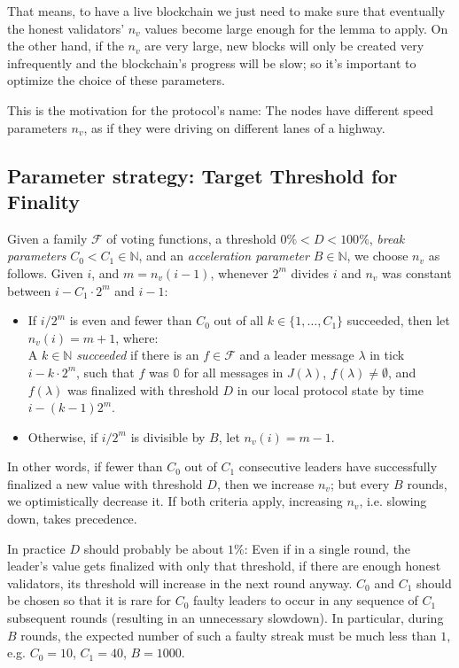 \documentclass[12pt]{article}
\begin{document}
That means, to have a live blockchain we just need to make sure that eventually the honest validators' $n_v$ values become large enough for the lemma to apply. On the other hand, if the $n_v$ are very large, new blocks will only be created very infrequently and the blockchain's progress will be slow; so it's important to optimize the choice of these parameters.

This is the motivation for the protocol's name: The nodes have different speed parameters $n_v$, as if they were driving on different lanes of a highway.


\subsection{Parameter strategy: Target Threshold for Finality}

Given a family $\mathcal{F}$ of voting functions, a threshold $0\% < D < 100\%$, \emph{break parameters} $C_0 < C_1 \in \mathbb{N}$, and an \emph{acceleration parameter} $B \in \mathbb{N}$, we choose $n_v$ as follows. Given $i$, and $m = n_v(i - 1)$, whenever $2^m$ divides $i$ and $n_v$ was constant between $i - C_1 \cdot 2^m$ and $i - 1$:
\begin{itemize}
  \item If $i/2^m$ is even and fewer than $C_0$ out of all $k \in \{1, \ldots, C_1\}$ succeeded, then let $n_v(i) = m + 1$, where:\\
    A $k \in \mathbb{N}$ \emph{succeeded} if there is an $f \in \mathcal{F}$ and a leader message $\lambda$ in tick $i - k \cdot 2^m$, such that $f$ was $\mathbb{0}$ for all messages in $J(\lambda)$, $f(\lambda) \neq \emptyset$, and $f(\lambda)$ was finalized with threshold $D$ in our local protocol state by time $i - (k - 1) 2^m$.
  \item Otherwise, if $i/2^m$ is divisible by $B$, let $n_v(i) = m - 1$.
\end{itemize}
In other words, if fewer than $C_0$ out of $C_1$ consecutive leaders have successfully finalized a new value with threshold $D$, then we increase $n_v$; but every $B$ rounds, we optimistically decrease it. If both criteria apply, increasing $n_v$, i.e. slowing down, takes precedence.

In practice $D$ should probably be about $1\%$: Even if in a single round, the leader's value gets finalized with only that threshold, if there are enough honest validators, its threshold will increase in the next round anyway. $C_0$ and $C_1$ should be chosen so that it is rare for $C_0$ faulty leaders to occur in any sequence of $C_1$ subsequent rounds (resulting in an unnecessary slowdown). In particular, during $B$ rounds, the expected number of such a faulty streak must be much less than $1$, e.g. $C_0 = 10$, $C_1 = 40$, $B = 1000$.
\end{document}

